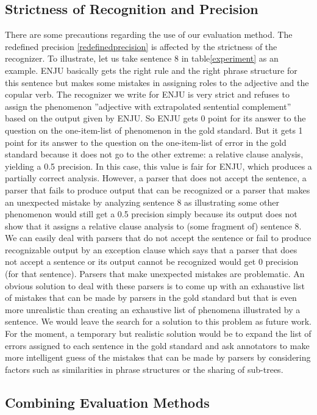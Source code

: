 \documentclass[11pt]{article}
\begin{document}
\subsection{Strictness of Recognition and Precision}
There are some precautions regarding the use of our evaluation method. The redefined precision \ref{redefinedprecision} is affected by the strictness of the recognizer. To illustrate, let us take  sentence 8 in table\ref{experiment} as an example. ENJU basically gets the right rule and the right phrase structure for this sentence but makes some mistakes in assigning roles to the adjective and the copular verb. The recognizer we write for ENJU is very strict and refuses to assign the phenomenon ''adjective with extrapolated sentential complement'' based on the output given by ENJU. So ENJU gets 0 point for its answer to the question on the one-item-list of phenomenon in the gold standard. But it gets 1 point for its answer to  the question on the one-item-list of error in the gold standard because it does not go to the other extreme: a relative clause analysis, yielding a 0.5 precision. In this case, this value is fair for ENJU, which produces a partially correct analysis. However, a parser that does not accept the sentence, a parser that fails to produce output that can be recognized  or a parser that makes an unexpected mistake by analyzing sentence 8 as illustrating some other phenomenon would still get a 0.5 precision simply because its output does not show that it assigns a relative clause analysis to (some fragment of) sentence 8. We can easily deal with parsers that do not accept the sentence or fail to produce recognizable output by an exception clause which says that a parser that does not accept a sentence or its output cannot be recognized would get 0 precision (for that sentence). Parsers that make unexpected mistakes are problematic. An obvious solution to deal with these parsers is to come up with an exhaustive list of mistakes that can be made by parsers in the gold standard but that is even more unrealistic than creating an exhaustive list of phenomena illustrated by a sentence. We would leave the search for a solution to this problem as future work. For the moment, a temporary but realistic solution would be to expand the list of errors assigned to each sentence in the gold standard and ask annotators to make more intelligent guess of the mistakes that can be made by parsers by considering factors such as similarities in phrase structures or the sharing of sub-trees. 

\subsection{Combining Evaluation Methods}
\end{document}
